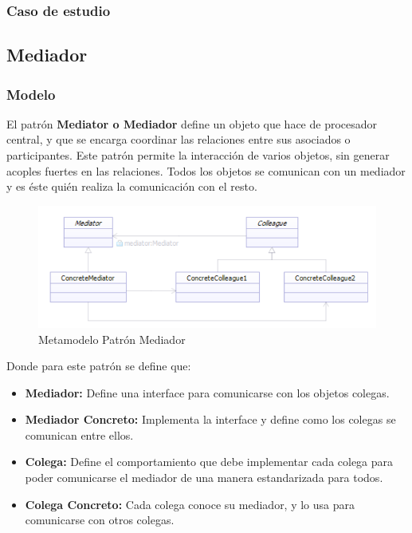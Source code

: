 \subsubsection{Caso de estudio}
\newpage

\subsection{Mediador}

\subsubsection{Modelo}
El patrón \textbf{Mediator o Mediador} define un objeto que hace de procesador central, y que se encarga coordinar las relaciones entre sus asociados o participantes. Este patrón permite la interacción de varios objetos, sin generar acoples fuertes en las relaciones. Todos los objetos se comunican con un mediador y es éste quién realiza la comunicación con el resto.

\begin{figure}[th!]
	\centering
	\includegraphics[width=0.8\linewidth]{arquitectura/imagenes/modeloMediador}
	\caption{Metamodelo Patrón Mediador}
	\label{fig:metamodelo patron mediador}
\end{figure}

Donde para este patrón se define que:
\begin{itemize}
	\item \textbf{Mediador: }Define una interface para comunicarse con los objetos colegas.
	\item \textbf{Mediador Concreto: }Implementa la interface y define como los colegas se comunican entre ellos.
	\item \textbf{Colega: }Define el comportamiento que debe implementar cada colega para poder comunicarse el mediador de una manera estandarizada para todos.
	\item \textbf{Colega Concreto: }Cada colega conoce su mediador, y lo usa para comunicarse con otros colegas.
\end{itemize}


